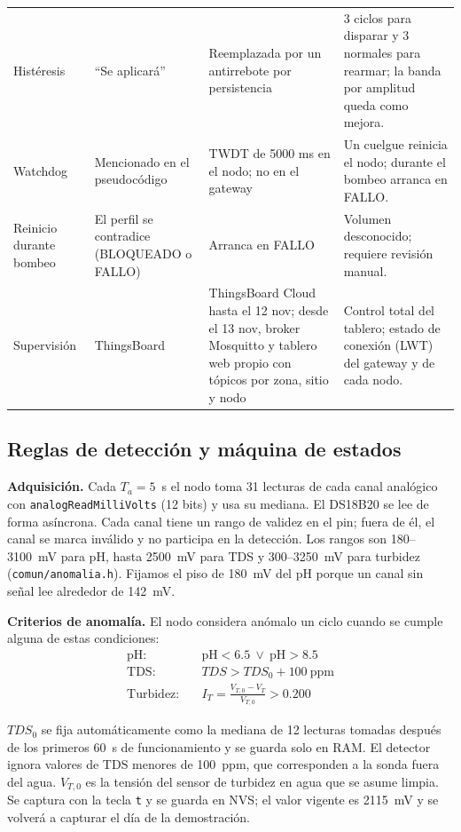 {\begin{longtable}{p{2.6cm}p{3.6cm}p{4.4cm}p{4.6cm}}
Histéresis & ``Se aplicará'' & Reemplazada por un antirrebote por persistencia & 3 ciclos para disparar y 3 normales para rearmar; la banda por amplitud queda como mejora. \\
Watchdog & Mencionado en el pseudocódigo & TWDT de 5000 ms en el nodo; no en el gateway & Un cuelgue reinicia el nodo; durante el bombeo arranca en FALLO. \\
Reinicio durante bombeo & El perfil se contradice (BLOQUEADO o FALLO) & Arranca en FALLO & Volumen desconocido; requiere revisión manual. \\
Supervisión & ThingsBoard & ThingsBoard Cloud hasta el 12 nov; desde el 13 nov, broker Mosquitto y tablero web propio con tópicos por zona, sitio y nodo & Control total del tablero; estado de conexión (LWT) del gateway y de cada nodo. \\
\bottomrule
\end{longtable}
}

\subsection{Reglas de detección y máquina de estados}
\label{sec:reglas}

\textbf{Adquisición.} Cada $T_a = 5$~s el nodo toma 31 lecturas de cada canal analógico con \texttt{analogRead\-MilliVolts} (12 bits) y usa su mediana. El DS18B20 se lee de forma asíncrona. Cada canal tiene un rango de validez en el pin; fuera de él, el canal se marca inválido y no participa en la detección. Los rangos son 180--3100~mV para pH, hasta 2500~mV para TDS y 300--3250~mV para turbidez (\texttt{comun/anomalia.h}). Fijamos el piso de 180~mV del pH porque un canal sin señal lee alrededor de 142~mV.

\textbf{Criterios de anomalía.} El nodo considera anómalo un ciclo cuando se cumple alguna de estas condiciones:
\begin{align}
\text{pH:}\quad & \mathrm{pH} < 6.5 \ \lor\ \mathrm{pH} > 8.5 \\
\text{TDS:}\quad & TDS > TDS_0 + 100~\text{ppm} \\
\text{Turbidez:}\quad & I_T = \frac{V_{T,0} - V_T}{V_{T,0}} > 0.200
\end{align}

$TDS_0$ se fija automáticamente como la mediana de 12 lecturas tomadas después de los primeros 60~s de funcionamiento y se guarda solo en RAM. El detector ignora valores de TDS menores de 100~ppm, que corresponden a la sonda fuera del agua. $V_{T,0}$ es la tensión del sensor de turbidez en agua que se asume limpia. Se captura con la tecla \texttt{t} y se guarda en NVS; el valor vigente es 2115~mV y se volverá a capturar el día de la demostración.

